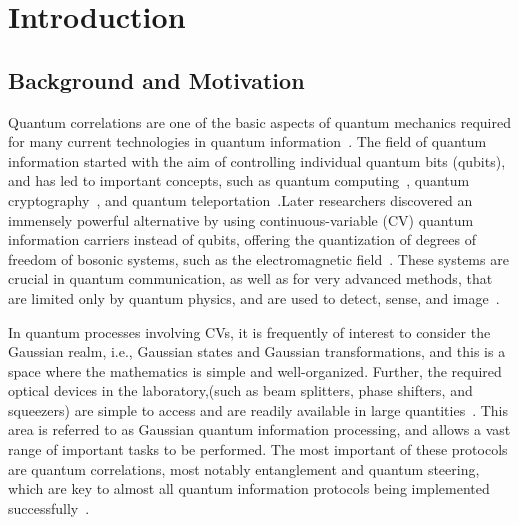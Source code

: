 
\chapter{Introduction}
\label{chp1}
\newpage

\section{Background and Motivation}

Quantum correlations are one of the basic aspects of quantum mechanics required for many current technologies in quantum information~\cite{NielsenChuang2000,AdessoRagyLee2014}. The field of quantum information started with the aim of controlling individual quantum bits (qubits), and has led to important concepts, such as quantum computing~\cite{NielsenChuang2000}, quantum
cryptography~\cite{Ekert1991}, and quantum teleportation~\cite{BennettBrassardCrepeauJozsaPeresWootters1993}.Later researchers discovered an immensely powerful alternative by using continuous-variable (CV) quantum information carriers instead of qubits, offering the quantization of degrees of freedom of bosonic systems, such as the electromagnetic field~\cite{Weedbrook2012,BraunsteinVanLoock2005}. These systems are crucial in quantum communication, as well as for very advanced methods, that are limited only by quantum physics, and are used to detect, sense, and image~\cite{Weedbrook2012}.

In quantum processes involving CVs, it is frequently of interest to consider the Gaussian realm, i.e., Gaussian states and Gaussian transformations, and this is a space where the mathematics is simple and well-organized. Further, the required optical devices in the laboratory,(such as beam splitters, phase shifters, and squeezers) are simple to access and are readily available in large quantities~\cite{Weedbrook2012}.
This area is referred to as Gaussian quantum information processing, and allows a vast range of important tasks to be performed. The most important of these protocols are quantum correlations, most notably entanglement and quantum steering, which are key to almost all quantum information protocols being implemented successfully~\cite{Weedbrook2012}.


